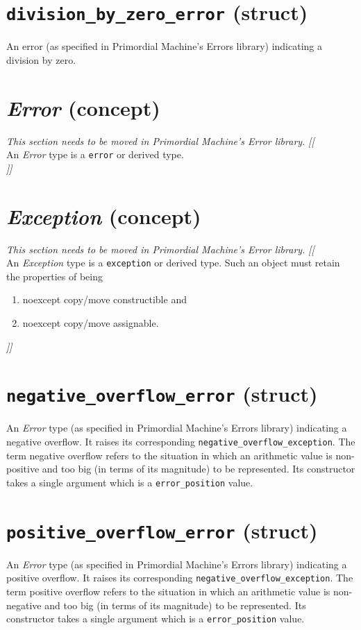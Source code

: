 \documentclass[oneside]{book}
\begin{document}
\section{\texttt{division\_by\_zero\_error} (struct)}
An error (as specified in Primordial Machine's Errors library) indicating a division by zero.

\section{\textit{Error} (concept)}
\textit{\color{orange}This section needs to be moved in Primordial Machine's Error library.}
\noindent\textit{\color{orange}[[}\\
An \textit{Error} type is a \texttt{error} or derived type.\\
\noindent\textit{\color{orange}]]}

\section{\textit{Exception} (concept)}
\textit{\color{orange}This section needs to be moved in Primordial Machine's Error library.}
\noindent\textit{\color{orange}[[}\\
An \textit{Exception} type is a \texttt{exception} or derived type.
Such an object must retain the properties of being
\begin{enumerate}
  \item noexcept copy/move constructible and
  \item noexcept copy/move assignable.
\end{enumerate}
\noindent\textit{\color{orange}]]}

\section{\texttt{negative\_overflow\_error} (struct)}
An \textit{Error} type (as specified in Primordial Machine's Errors library) indicating a negative overflow.
It raises its corresponding \texttt{negative\_overflow\_exception}.
The term negative overflow refers to the situation in which an arithmetic value is non-positive and
too big (in terms of its magnitude) to be represented. Its constructor takes a single argument which
is a \texttt{error\_position} value.

\section{\texttt{positive\_overflow\_error} (struct)}
An \textit{Error} type (as specified in Primordial Machine's Errors library) indicating a positive overflow.
It raises its corresponding \texttt{negative\_overflow\_exception}.
The term positive overflow refers to the situation in which an arithmetic value is non-negative and
too big (in terms of its magnitude) to be represented. Its constructor takes a single argument which
is a \texttt{error\_position} value.
\end{document}
